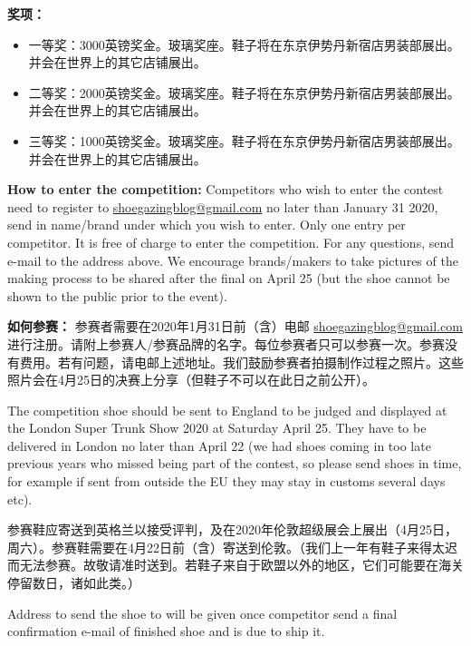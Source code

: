 \begin{paracol}{2}
        \switchcolumn
        \textbf{奖项：}
        \begin{itemize}
            \item 一等奖：3000英镑奖金。玻璃奖座。鞋子将在东京伊势丹新宿店男装部展出。并会在世界上的其它店铺展出。
            \item 二等奖：2000英镑奖金。玻璃奖座。鞋子将在东京伊势丹新宿店男装部展出。并会在世界上的其它店铺展出。
            \item 三等奖：1000英镑奖金。玻璃奖座。鞋子将在东京伊势丹新宿店男装部展出。并会在世界上的其它店铺展出。
        \end{itemize}
        \switchcolumn*

        \textbf{How to enter the competition:}
        Competitors who wish to enter the contest need to register to \href{mailto:shoegazingblog@gmail.com}{shoegazingblog@gmail.com} no later than January 31 2020, send in name/brand under which you wish to enter. Only one entry per competitor. It is free of charge to enter the competition. For any questions, send e-mail to the address above. We encourage brands/makers to take pictures of the making process to be shared after the final on April 25 (but the shoe cannot be shown to the public prior to the event).

        \switchcolumn
        \textbf{如何参赛：}
        参赛者需要在2020年1月31日前（含）电邮
        \href{mailto:shoegazingblog@gmail.com}{shoegazingblog@gmail.com}进行注册。请附上参赛人/参赛品牌的名字。每位参赛者只可以参赛一次。参赛没有费用。若有问题，请电邮上述地址。我们鼓励参赛者拍摄制作过程之照片。这些照片会在4月25日的决赛上分享（但鞋子不可以在此日之前公开）。
        \switchcolumn*

        The competition shoe should be sent to England to be judged and displayed at the London Super Trunk Show 2020 at Saturday April 25. They have to be delivered in London no later than April 22 (we had shoes coming in too late previous years who missed being part of the contest, so please send shoes in time, for example if sent from outside the EU they may stay in customs several days etc).

        \switchcolumn
        参赛鞋应寄送到英格兰以接受评判，及在2020年伦敦超级展会上展出（4月25日，周六）。参赛鞋需要在4月22日前（含）寄送到伦敦。（我们上一年有鞋子来得太迟而无法参赛。故敬请准时送到。若鞋子来自于欧盟以外的地区，它们可能要在海关停留数日，诸如此类。）
        \switchcolumn*

        Address to send the shoe to will be given once competitor send a final confirmation e-mail of finished shoe and is due to ship it.


\end{paracol}
